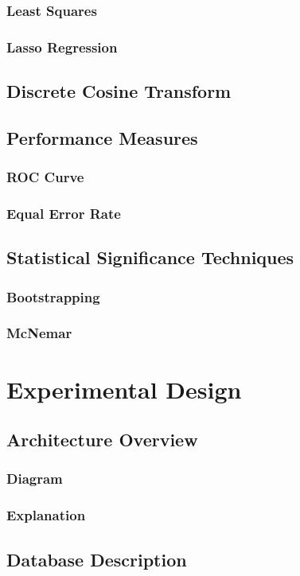 \documentclass[11pt,a4paper]{tesis}
\begin{document}
		\subsection{Least Squares}
		\subsection{Lasso Regression}
	\section{Discrete Cosine Transform}
	\section{Performance Measures}
		\subsection{ROC Curve}
		\subsection{Equal Error Rate}
			
	\section{Statistical Significance Techniques}
		\subsection{Bootstrapping}
		\subsection{McNemar}

\chapter{Experimental Design}
	\section{Architecture Overview}
		\subsection{Diagram}
		\subsection{Explanation}
	\section{Database Description}
\end{document}
